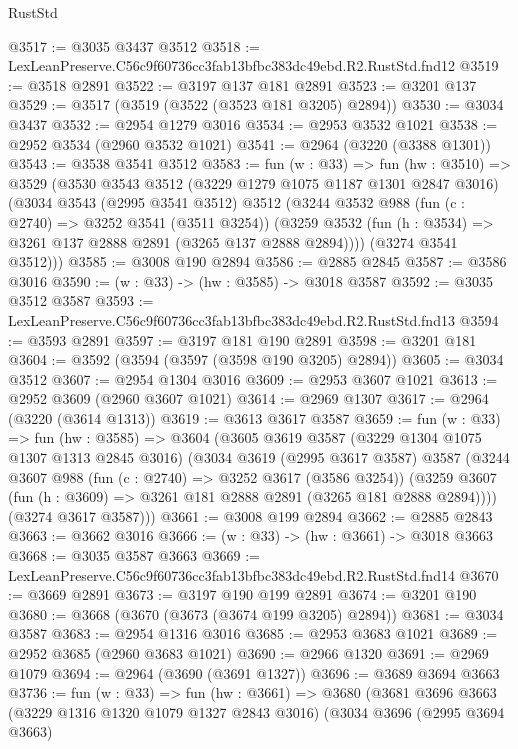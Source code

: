 \begin{lexlean}{RustStd}
\begin{coremodule}
@3517 := @3035 @3437 @3512
@3518 := LexLeanPreserve.C56c9f60736cc3fab13bfbc383dc49ebd.R2.RustStd.fnd12
@3519 := @3518 @2891
@3522 := @3197 @137 @181 @2891
@3523 := @3201 @137
@3529 := @3517 (@3519 (@3522 (@3523 @181 @3205) @2894))
@3530 := @3034 @3437
@3532 := @2954 @1279 @3016
@3534 := @2953 @3532 @1021
@3538 := @2952 @3534 (@2960 @3532 @1021)
@3541 := @2964 (@3220 (@3388 @1301))
@3543 := @3538 @3541 @3512
@3583 := fun (w : @33) =>
  fun (hw : @3510) =>
  @3529
    (@3530
      @3543
      @3512
      (@3229 @1279 @1075 @1187 @1301 @2847 @3016)
      (@3034
        @3543
        (@2995 @3541 @3512)
        @3512
        (@3244
          @3532
          @988
          (fun (c : @2740) => @3252 @3541 (@3511 @3254))
          (@3259 @3532 (fun (h : @3534) => @3261 @137 @2888 @2891 (@3265 @137 @2888 @2894))))
        (@3274 @3541 @3512)))
@3585 := @3008 @190 @2894
@3586 := @2885 @2845
@3587 := @3586 @3016
@3590 := (w : @33) -> (hw : @3585) -> @3018 @3587
@3592 := @3035 @3512 @3587
@3593 := LexLeanPreserve.C56c9f60736cc3fab13bfbc383dc49ebd.R2.RustStd.fnd13
@3594 := @3593 @2891
@3597 := @3197 @181 @190 @2891
@3598 := @3201 @181
@3604 := @3592 (@3594 (@3597 (@3598 @190 @3205) @2894))
@3605 := @3034 @3512
@3607 := @2954 @1304 @3016
@3609 := @2953 @3607 @1021
@3613 := @2952 @3609 (@2960 @3607 @1021)
@3614 := @2969 @1307
@3617 := @2964 (@3220 (@3614 @1313))
@3619 := @3613 @3617 @3587
@3659 := fun (w : @33) =>
  fun (hw : @3585) =>
  @3604
    (@3605
      @3619
      @3587
      (@3229 @1304 @1075 @1307 @1313 @2845 @3016)
      (@3034
        @3619
        (@2995 @3617 @3587)
        @3587
        (@3244
          @3607
          @988
          (fun (c : @2740) => @3252 @3617 (@3586 @3254))
          (@3259 @3607 (fun (h : @3609) => @3261 @181 @2888 @2891 (@3265 @181 @2888 @2894))))
        (@3274 @3617 @3587)))
@3661 := @3008 @199 @2894
@3662 := @2885 @2843
@3663 := @3662 @3016
@3666 := (w : @33) -> (hw : @3661) -> @3018 @3663
@3668 := @3035 @3587 @3663
@3669 := LexLeanPreserve.C56c9f60736cc3fab13bfbc383dc49ebd.R2.RustStd.fnd14
@3670 := @3669 @2891
@3673 := @3197 @190 @199 @2891
@3674 := @3201 @190
@3680 := @3668 (@3670 (@3673 (@3674 @199 @3205) @2894))
@3681 := @3034 @3587
@3683 := @2954 @1316 @3016
@3685 := @2953 @3683 @1021
@3689 := @2952 @3685 (@2960 @3683 @1021)
@3690 := @2966 @1320
@3691 := @2969 @1079
@3694 := @2964 (@3690 (@3691 @1327))
@3696 := @3689 @3694 @3663
@3736 := fun (w : @33) =>
  fun (hw : @3661) =>
  @3680
    (@3681
      @3696
      @3663
      (@3229 @1316 @1320 @1079 @1327 @2843 @3016)
      (@3034
        @3696
        (@2995 @3694 @3663)

\end{coremodule}
\end{lexlean}
